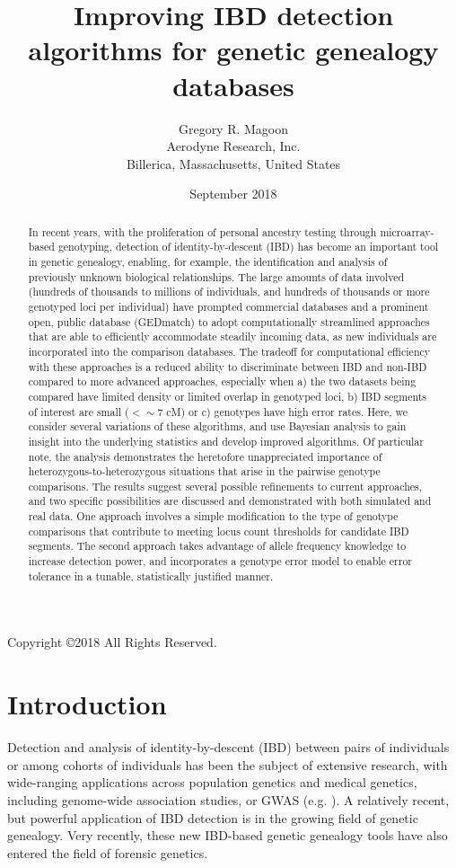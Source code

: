 \documentclass{article}
\title{Improving IBD detection algorithms for genetic genealogy databases}
\author{Gregory R. Magoon\\Aerodyne Research, Inc.\\Billerica, Massachusetts, United States}
\date{September 2018}
\begin{document}
\maketitle
\begin{center}
Copyright \copyright 2018 All Rights Reserved.
\end{center}

\begin{abstract}
    In recent years, with the proliferation of personal ancestry testing through microarray-based genotyping, detection of identity-by-descent (IBD) has become an important tool in genetic genealogy, enabling, for example, the identification and analysis of previously unknown biological relationships. The large amounts of data involved (hundreds of thousands to millions of individuals, and hundreds of thousands or more genotyped loci per individual) have prompted commercial databases and a prominent open, public database (GEDmatch) to adopt computationally streamlined approaches that are able to efficiently accommodate steadily incoming data, as new individuals are incorporated into the comparison databases. The tradeoff for computational efficiency with these approaches is a reduced ability to discriminate between IBD and non-IBD compared to more advanced approaches, especially when a) the two datasets being compared have limited density or limited overlap in genotyped loci, b) IBD segments of interest are small ($<\sim$7 cM) or c) genotypes have high error rates. Here, we consider several variations of these algorithms, and use Bayesian analysis to gain insight into the underlying statistics and develop improved algorithms. Of particular note, the analysis demonstrates the heretofore unappreciated importance of heterozygous-to-heterozygous situations that arise in the pairwise genotype comparisons. The results suggest several possible refinements to current approaches, and two specific possibilities are discussed and demonstrated with both simulated and real data. One approach involves a simple modification to the type of genotype comparisons that contribute to meeting locus count thresholds for candidate IBD segments. The second approach takes advantage of allele frequency knowledge to increase detection power, and incorporates a genotype error model to enable error tolerance in a tunable, statistically justified manner.
\end{abstract}

\section{Introduction}
Detection and analysis of identity-by-descent (IBD) between pairs of individuals or among cohorts of individuals has been the subject of extensive research, with wide-ranging applications across population genetics and medical genetics, including genome-wide association studies, or GWAS (e.g. \citep{GERMLINE} \citep{PLINK} \citep{Albrechtsen} \citep{beagle} \citep{speeDB} \citep{Parente2}  \citep{fastIBD} \citep{ERSA} \citep{ERSA2} \citep{decode}). A relatively recent, but powerful application of IBD detection is in the growing field of genetic genealogy.\citep{23andMe} Very recently, these new IBD-based genetic genealogy tools have also entered the field of forensic genetics.\citep{GSK}
\end{document}
